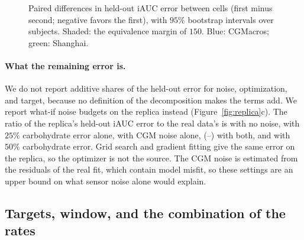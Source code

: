 

\begin{figure}[tbp]
\centering
{}
\caption{Paired differences in held-out iAUC error between cells (first minus second; negative favors the first), with
$95\%$ bootstrap intervals over subjects. Shaded: the equivalence margin of $150$. Blue: CGMacros; green: Shanghai.}
\label{fig:prediction}
\end{figure}

\paragraph{What the remaining error is.}
We do not report additive shares of the held-out error for noise, optimization, and target, because no definition of the
decomposition makes the terms add. We report what-if noise budgets on the replica instead (Figure~\ref{fig:replica}c).
The ratio of the replica's held-out iAUC error to the real data's is \resReplicaRatioCgmOffCarbZero{} with no noise,
\resReplicaRatioCgmOffCarbQuarter{} with $25\%$ carbohydrate error alone, \resReplicaRatioCgmOnCarbZero{} with CGM noise
alone, \resReplicaRatioCgmOnCarbQuarter{} (\resReplicaRatioCgmOnCarbQuarterLow--\resReplicaRatioCgmOnCarbQuarterHigh)
with both, and \resReplicaRatioCgmOnCarbHalf{} with $50\%$ carbohydrate error. Grid search and gradient fitting give the same
error on the replica, so the optimizer is not the source. The CGM noise is estimated from the residuals of the real
fit, which contain model misfit, so these settings are an upper bound on what sensor noise alone would explain.

\subsection{Targets, window, and the combination of the rates}
\label{apx:more}

